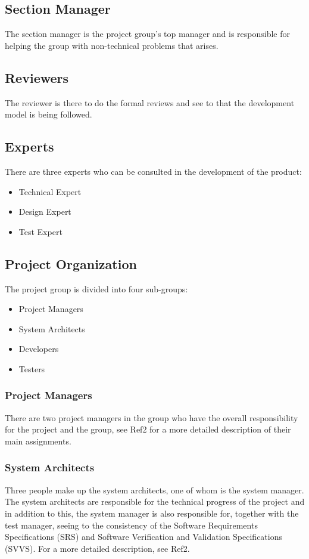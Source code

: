 \documentclass[a4paper]{article}
\begin{document}
\subsection{Section Manager}
The section manager is the project group's top manager and is responsible for helping the group with non-technical problems that arises.

\subsection{Reviewers}
The reviewer is there to do the formal reviews and see to that the development model is being followed.

\subsection{Experts}
There are three experts who can be consulted in the development of the product:
\begin{itemize}
\item Technical Expert
\item Design Expert
\item Test Expert
\end{itemize}

\subsection{Project Organization}

The project group is divided into four sub-groups:
\begin{itemize}
\item Project Managers
\item System Architects
\item Developers
\item Testers
\end{itemize}

\subsubsection{Project Managers}
There are two project managers in the group who have the overall responsibility for the project and the group, see Ref2 for a more detailed description of their main assignments.

\subsubsection{System Architects}
Three people make up the system architects, one of whom is the system manager. The system architects are responsible for the technical progress of the project and in addition to this, the system manager is also responsible for, together with the test manager, seeing to the consistency of the Software Requirements Specifications (SRS) and Software Verification and Validation Specifications (SVVS). For a more detailed description, see Ref2.
\end{document}
